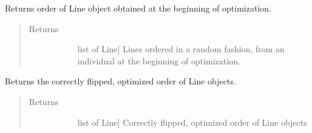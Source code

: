 \documentclass[letterpaper,10pt,english,openany,oneside]{sphinxmanual}
\begin{document}
\begin{fulllineitems}
\begin{fulllineitems}
\end{fulllineitems}


\begin{fulllineitems}
\label{\detokenize{reference:cnc.optimization.CNCOptimizer.get_initial}}
Returns order of Line object obtained at the beginning of optimization.
\begin{quote}\begin{description}
\item[{Returns}] \leavevmode\begin{description}
\item[{}] \leavevmode{[}list of Line{]}
Lines ordered in a random fashion, from an individual at the
beginning of optimization.

\end{description}

\end{description}\end{quote}

\end{fulllineitems}


\begin{fulllineitems}
\label{\detokenize{reference:cnc.optimization.CNCOptimizer.get_result}}
Returns the correctly flipped, optimized order of Line objects.
\begin{quote}\begin{description}
\item[{Returns}] \leavevmode\begin{description}
\item[{}] \leavevmode{[}list of Line{]}
Correctly flipped, optimized order of Line objects

\item[{}] \leavevmode
\end{description}

\end{description}\end{quote}


\end{fulllineitems}
\end{fulllineitems}
\end{document}
